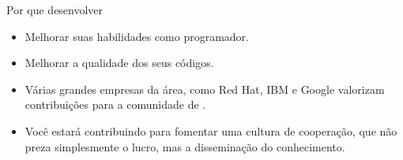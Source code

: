 \documentclass{beamer}
\begin{document}
\begin{frame}{Por que desenvolver \softwarelivre}
  \begin{itemize}
    \item Melhorar suas habilidades como programador.
    \item Melhorar a qualidade dos seus códigos.
    \item Várias grandes empresas da área, como Red Hat, IBM e Google valorizam
      contribuições para a comunidade de \softwarelivre.
    \item Você estará contribuindo para fomentar uma cultura de cooperação, que não
      preza simplesmente o lucro, mas a disseminação do conhecimento.
  \end{itemize}
\end{frame}

\begin{frame}
  \begin{center}
    \begin{shell}
    \end{shell}
  \end{center}
\end{frame}
\end{document}
